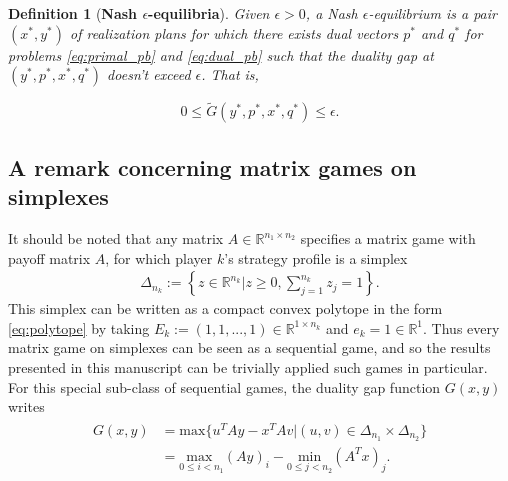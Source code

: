 \documentclass{article}
\newtheorem{definition}{Definition}
\begin{document}
\begin{definition}[\textbf{Nash $\epsilon$-equilibria}]
Given $\epsilon > 0$, a Nash $\epsilon$-equilibrium is
a pair $(x^*, y^*)$ of realization plans for which there exists dual
vectors $p^*$ and $q^*$ for problems \eqref{eq:primal_pb} and
\eqref{eq:dual_pb} such that the duality gap at $(y^*, p^*, x^*, q^*)$
doesn't exceed $\epsilon$. That is,

\begin{equation}
  0 \le \tilde{G}(y^*, p^*, x^*, q^*) \le \epsilon.
\label{eq:approx_pb}
\end{equation}
\label{thm:approx_nash}
\end{definition}

\subsection{A remark concerning matrix games on simplexes}
It should be noted that any matrix $A \in \mathbb{R}^{n_1 \times n_2}$
specifies a matrix game with payoff matrix $A$, for which player $k$'s
strategy profile is a simplex
\begin{eqnarray}
\Delta_{n_k} := \left\{z \in \mathbb{R}^{n_k}|z \ge 0,\sum_{j=1}^{n_k}
z_j = 1\right\}.
\end{eqnarray}
This simplex can be written as a compact convex polytope in
the form \eqref{eq:polytope} by taking $E_k := (1, 1, ..., 1) \in
\mathbb{R}^{1 \times n_k}$ and $e_k = 1 \in \mathbb{R}^1$. Thus every
matrix game on simplexes can be seen as a sequential game, and so the
results presented in this manuscript can be trivially applied such
games in particular. For this special sub-class of sequential games,
the duality gap function $G(x,y)$ writes
\begin{eqnarray}
\begin{split}
G(x, y) &=
\mathrm{max}\{u^TAy - x^TAv | (u,v) \in
\Delta_{n_1} \times \Delta_{n_2}\}\\
&= \underset{0 \le i <
  n_1}{\text{max }}(Ay)_i - \underset{0 \le j < n_2}{\text{min
}}(A^Tx)_j.
\end{split}
\label{eq:mg_pd}
\end{eqnarray}
\end{document}
